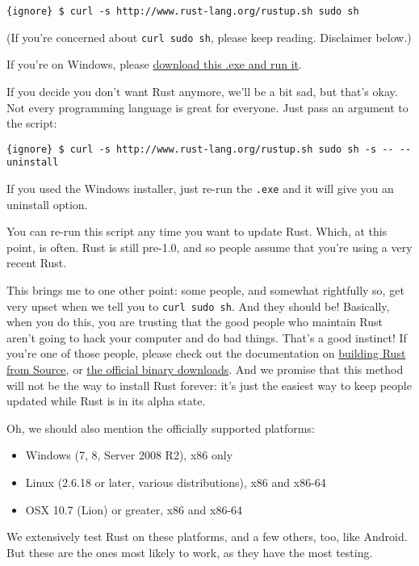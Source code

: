 \documentclass[]{article}
\begin{document}
\texttt{\{ignore\} \$ curl -s http://www.rust-lang.org/rustup.sh \textbar{} sudo sh}

(If you're concerned about \texttt{curl \textbar{} sudo sh}, please keep
reading. Disclaimer below.)

If you're on Windows, please
\href{http://static.rust-lang.org/dist/rust-nightly-install.exe}{download
this .exe and run it}.

If you decide you don't want Rust anymore, we'll be a bit sad, but
that's okay. Not every programming language is great for everyone. Just
pass an argument to the script:

\texttt{\{ignore\} \$ curl -s http://www.rust-lang.org/rustup.sh \textbar{} sudo sh -s -\/- -\/-uninstall}

If you used the Windows installer, just re-run the \texttt{.exe} and it
will give you an uninstall option.

You can re-run this script any time you want to update Rust. Which, at
this point, is often. Rust is still pre-1.0, and so people assume that
you're using a very recent Rust.

This brings me to one other point: some people, and somewhat rightfully
so, get very upset when we tell you to \texttt{curl \textbar{} sudo sh}.
And they should be! Basically, when you do this, you are trusting that
the good people who maintain Rust aren't going to hack your computer and
do bad things. That's a good instinct! If you're one of those people,
please check out the documentation on
\href{https://github.com/rust-lang/rust\#building-from-source}{building
Rust from Source}, or \href{http://www.rust-lang.org/install.html}{the
official binary downloads}. And we promise that this method will not be
the way to install Rust forever: it's just the easiest way to keep
people updated while Rust is in its alpha state.

Oh, we should also mention the officially supported platforms:

\begin{itemize}
\itemsep1pt\parskip0pt
\item
  Windows (7, 8, Server 2008 R2), x86 only
\item
  Linux (2.6.18 or later, various distributions), x86 and x86-64
\item
  OSX 10.7 (Lion) or greater, x86 and x86-64
\end{itemize}

We extensively test Rust on these platforms, and a few others, too, like
Android. But these are the ones most likely to work, as they have the
most testing.
\end{document}
